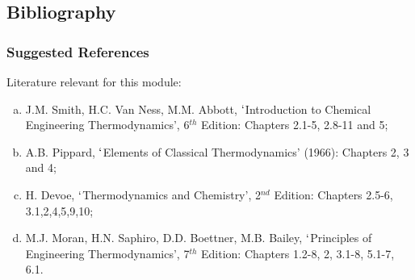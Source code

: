 \documentclass[10pt,compress]{beamer}
\begin{document}
\subsection{Bibliography} 
\begin{frame}
 \frametitle{Suggested References}
  Literature relevant for this module:
  \begin{enumerate}[(a)]
   \item J.M. Smith, H.C. Van Ness, M.M. Abbott, $\lq$Introduction to Chemical Engineering Thermodynamics', 6$^{th}$ Edition: Chapters 2.1-5, 2.8-11 and 5;
   \item A.B. Pippard, $\lq$Elements of Classical Thermodynamics' (1966): Chapters 2, 3 and 4;
   \item H. Devoe, $\lq$Thermodynamics and Chemistry', 2$^{nd}$ Edition: Chapters 2.5-6, 3.1,2,4,5,9,10;
   \item M.J. Moran, H.N. Saphiro, D.D. Boettner, M.B. Bailey, $\lq$Principles of Engineering Thermodynamics', 7$^{th}$ Edition: Chapters 1.2-8, 2, 3.1-8, 5.1-7, 6.1.
  \end{enumerate}
\end{frame}

\end{document}
